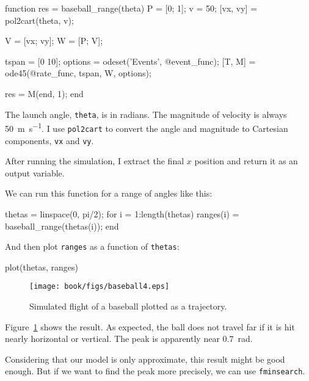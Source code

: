 
\begin{code}
function res = baseball_range(theta)
    P = [0; 1];       
    v = 50;           
    [vx, vy] = pol2cart(theta, v);
    
    V = [vx; vy];     %
    W = [P; V];       %
    
    tspan = [0 10];
    options = odeset('Events', @event_func);
    [T, M] = ode45(@rate_func, tspan, W, options);
    
    res = M(end, 1);
end
\end{code}

The launch angle, {\tt theta}, is in radians.  The magnitude of velocity is always \SI{50}{\meter\per\second}.  I use {\tt pol2cart} to convert the angle and magnitude to Cartesian components, {\tt vx} and {\tt vy}.


After running the simulation, I extract the final $x$ position and return it as an output variable.  

We can run this function for a range of angles like this:

\begin{code}
    thetas = linspace(0, pi/2);
    for i = 1:length(thetas)
        ranges(i) = baseball_range(thetas(i));
    end
\end{code}

And then plot {\tt ranges} as a function of {\tt thetas}:

\begin{code}
    plot(thetas, ranges)
\end{code}

\begin{figure}
\centerline{\texttt{[image: book/figs/baseball4.eps]}}
\caption{Simulated flight of a baseball plotted as a trajectory.}
\label{fig:baseball4}
\end{figure}

Figure~\ref{fig:baseball4} shows the result.  As expected, the ball does not travel far if it is hit nearly horizontal or vertical. 
The peak is apparently near \SI{0.7}{\radian}.

Considering that our model is only approximate, this result might be good enough.  But if we want to find the peak more precisely, we can use {\tt fminsearch}.


